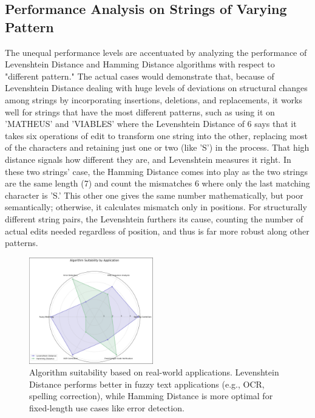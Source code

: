 \documentclass[conference]{IEEEtran}
\begin{document}
\subsection{Performance Analysis on Strings of Varying Pattern}
The unequal performance levels are accentuated by analyzing the performance of Levenshtein Distance and Hamming Distance algorithms with respect to "different pattern." The actual cases would demonstrate that, because of Levenshtein Distance dealing with huge levels of deviations on structural changes among strings by incorporating insertions, deletions, and replacements, it works well for strings that have the most different patterns, such as using it on 'MATHEUS' and 'VIABLES' where the Levenshtein Distance of 6 says that it takes six operations of edit to transform one string into the other, replacing most of the characters and retaining just one or two (like 'S') in the process. That high distance signals how different they are, and Levenshtein measures it right. In these two strings' case, the Hamming Distance comes into play as the two strings are the same length (7) and count the mismatches 6 where only the last matching character is 'S.' This other one gives the same number mathematically, but poor semantically; otherwise, it calculates mismatch only in positions. For structurally different string pairs, the Levenshtein furthers its cause, counting the number of actual edits needed regardless of position, and thus is far more robust along other patterns.

\begin{figure}[htbp]
\centering
\includegraphics[width=0.48\textwidth]{application_suitability.png}
\caption{Algorithm suitability based on real-world applications. Levenshtein Distance performs better in fuzzy text applications (e.g., OCR, spelling correction), while Hamming Distance is more optimal for fixed-length use cases like error detection.}
\label{fig:application-suitability}
\end{figure}
\end{document}
